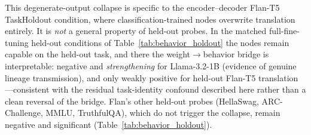 \documentclass{article}
\theoremstyle{definition}
\theoremstyle{plain}
\begin{document}
This degenerate-output collapse is specific to the encoder--decoder Flan-T5 TaskHoldout condition,
where classification-trained nodes overwrite translation entirely. It is \emph{not} a general property
of held-out probes. In the matched full-fine-tuning held-out conditions of
Table~\ref{tab:behavior_holdout} the nodes remain capable on the held-out task, and there the
weight$\to$behavior bridge is interpretable: negative and \emph{strengthening} for Llama-3.2-1B
(evidence of genuine lineage transmission), and only weakly positive for held-out Flan-T5
translation---consistent with the residual task-identity confound described here rather than a clean
reversal of the bridge. Flan's other held-out probes (HellaSwag, ARC-Challenge, MMLU, TruthfulQA), which
do not trigger the collapse, remain negative and significant (Table~\ref{tab:behavior_holdout}).
\end{document}
